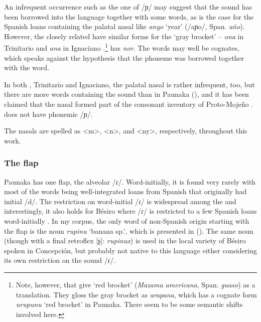 An infrequent occurrence such as the one of /ɲ/ may suggest that the sound has been borrowed into the language together with some words, as is the case for the Spanish loans containing the palatal nasal like \textit{anyo} ‘year’ (/aɲo/, Span. \textit{año}). However, the closely related  have similar forms for the ‘gray brocket’ – \textit{ona} in Trinitario \citep[32]{Gill1993} and \textit{ana} in Ignaciano \citep[67]{OttOtt1983}.\footnote{\label{fn:arapana}Note, however, that \citet[67]{OttOtt1983} give ‘red brocket’ (\textit{Mazama americana}, Span. \textit{guaso}) as a translation. They gloss the gray brocket as \textit{arapana}, which has a cognate form \textit{urupunu} ‘red brocket’ in Paunaka. There seem to be some semantic shifts involved here.}  has \textit{nor}. The words may well be cognates, which speaks against the hypothesis that the phoneme was borrowed together with the word.

In both , Trinitario and Ignaciano, the palatal nasal is rather infrequent, too, but there are more words containing the sound than in Paunaka (\citealp[cf.][]{OttOtt1983}), and it has been claimed that the nasal formed part of the consonant inventory of Proto-Mojeño \citep[13]{CarvalhoRose2018}.  does not have phonemic /ɲ/.

The nasals are spelled as <m>, <n>, and <ny>, respectively, throughout this work.

\subsubsection{The flap}\label{phonology_r}
Paunaka has one flap, the alveolar /ɾ/. Word-initially, it is found very rarely with most of the words being well-integrated loans from Spanish that originally had initial /d/. The restriction on word-initial /ɾ/ is widespread among the  \citep[787]{Mihas2017} and interestingly, it also holds for Bésiro where /ɾ/ is restricted to a few Spanish loans word-initially \citep[cf.][61]{Sans2010}. In my corpus, the only word of non-Spanish origin starting with the flap is the noun \textit{rupinu} ‘banana sp.’, which is presented in (). The same noun (though with a final retroflex [ʂ]: \textit{rupinux}) is used in the local variety of Bésiro spoken in Concepción, but probably not native to this language either considering its own restriction on the sound /ɾ/.

